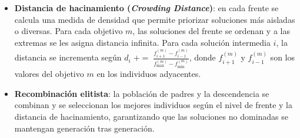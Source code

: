 \begin{itemize}
\item \textbf{Distancia de hacinamiento (\textit{Crowding Distance})}: en cada frente se
calcula una medida de densidad que permite priorizar soluciones más aisladas o diversas. 
Para cada objetivo $m$, las soluciones del frente se ordenan y a las extremas se les
asigna distancia infinita. Para cada solución intermedia $i$, la distancia se incrementa según
$d_i \;+=\;
\frac{f_{i+1}^{(m)} - f_{i-1}^{(m)}}{f_{\max}^{(m)} - f_{\min}^{(m)}}$,
donde $f_{i+1}^{(m)}$ y $f_{i-1}^{(m)}$ son los valores del objetivo $m$ en los individuos
adyacentes.

    \item \textbf{Recombinación elitista}: la población de padres y la descendencia se
    combinan y se seleccionan los mejores individuos según el nivel de frente y la distancia de
    hacinamiento, garantizando que las soluciones no dominadas se mantengan generación tras
    generación.  
\end{itemize}

